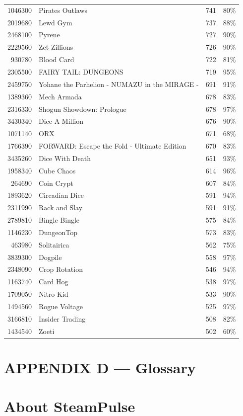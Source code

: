 \documentclass[11pt,letterpaper]{report}
\begin{document}
\begin{center}
\begin{tabular}{rlrl}
1046300 & Pirates Outlaws & 741 & 80\%\\
2019680 & Lewd Gym & 737 & 88\%\\
2468100 & Pyrene & 727 & 90\%\\
2229560 & Zet Zillions & 726 & 90\%\\
930780 & Blood Card & 722 & 81\%\\
2305500 & FAIRY TAIL: DUNGEONS & 719 & 95\%\\
2459750 & Yohane the Parhelion - NUMAZU in the MIRAGE - & 691 & 91\%\\
1389360 & Mech Armada & 678 & 83\%\\
2316330 & Shogun Showdown: Prologue & 678 & 97\%\\
3430340 & Dice A Million & 676 & 90\%\\
1071140 & ORX & 671 & 68\%\\
1766390 & FORWARD: Escape the Fold - Ultimate Edition & 670 & 83\%\\
3435260 & Dice With Death & 651 & 93\%\\
1958340 & Cube Chaos & 614 & 96\%\\
264690 & Coin Crypt & 607 & 84\%\\
1893620 & Circadian Dice & 591 & 94\%\\
2311990 & Rack and Slay & 591 & 91\%\\
2789810 & Bingle Bingle & 575 & 84\%\\
1146230 & DungeonTop & 573 & 83\%\\
463980 & Solitairica & 562 & 75\%\\
3839300 & Dogpile & 558 & 97\%\\
2348090 & Crop Rotation & 546 & 94\%\\
1163740 & Card Hog & 538 & 97\%\\
1709050 & Nitro Kid & 533 & 90\%\\
1494560 & Rogue Voltage & 525 & 97\%\\
3166810 & Insider Trading & 508 & 82\%\\
1434540 & Zoeti & 502 & 60\%\\
\end{tabular}
\end{center}
\part*{APPENDIX D — Glossary}
\label{sec:org955251a}
\part*{About SteamPulse}
\label{sec:org79b4cef}
\end{document}
